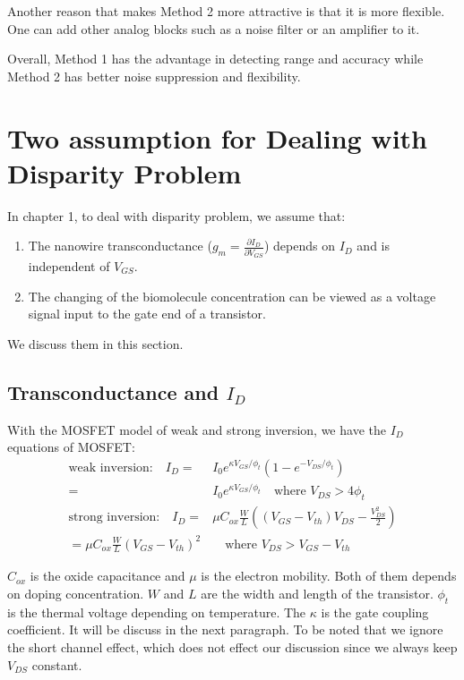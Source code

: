 Another reason that makes Method 2 more attractive is that it is more flexible.
One can add other analog blocks such as a noise filter or an amplifier to it.

Overall, Method 1 has the advantage in detecting range and accuracy while Method 2 has better noise suppression and flexibility.



\section{Two assumption for Dealing with Disparity Problem} \label{sec:assumpDiscuss}
In chapter 1, to deal with disparity problem, we assume that:
\begin{enumerate}
    \item The nanowire transconductance ($g_m = \frac{\partial I_D}{\partial V_{GS}}$) depends on $I_D$ and is independent of $V_{GS}$.
    \item The changing of the biomolecule concentration can be viewed as a voltage signal input to the gate end of a transistor.
\end{enumerate}
We discuss them in this section.

\subsection{Transconductance and $I_D$} \label{section:IdGm}
With the MOSFET model of weak and strong inversion, we have the $I_D$ equations of MOSFET:
\setlength{\mathindent}{1.5cm}
\begin{align}
    \text{weak inversion:} \quad I_D   = & I_0e^{\kappa V_{GS}/\phi_t}(1 - e^{-V_{DS}/\phi_t})  \label{eq:Ikappa} \\
                                       = & I_0e^{\kappa V_{GS}/\phi_t} \quad \text{where $V_{DS} > 4 \phi_t$ } \\
    \text{strong inversion:} \quad I_D = & \mu C_{ox} \frac{W}{L}((V_{GS} - V_{th})V_{DS} - \frac{V_{DS}^2}{2}) \\
                                       = \mu C_{ox} \frac{W}{L}(V_{GS} - V_{th})^2 &\quad \text{where $V_{DS} > V_{GS} - V_{th}$} \label{eq:ID_Strong}
\end{align}

$C_{ox}$ is the oxide capacitance and $\mu$ is the electron mobility.
Both of them depends on doping concentration.
$W$ and $L$ are the width and length of the transistor.
$\phi_t$ is the thermal voltage depending on temperature.
The $\kappa$ is the gate coupling coefficient.
It will be discuss in the next paragraph.
To be noted that we ignore the short channel effect, which does not effect our discussion since we always keep $V_{DS}$ constant.

